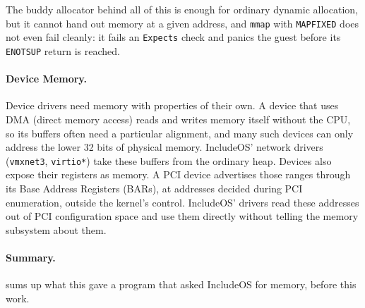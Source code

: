 \documentclass[12pt]{report}
\renewcommand{\_}{\origunderscore\allowbreak}
\begin{document}
The buddy allocator behind all of this is enough for ordinary dynamic allocation, but it cannot hand out memory at a given address, and \texttt{mmap} with \texttt{MAP\_FIXED} does not even fail cleanly: it fails an \texttt{Expects} check and panics the guest before its \texttt{ENOTSUP} return is reached.

\paragraph{Device Memory.}

Device drivers need memory with properties of their own. A device that uses DMA (direct memory access) reads and writes memory itself without the CPU, so its buffers often need a particular alignment, and many such devices can only address the lower 32 bits of physical memory. IncludeOS' network drivers (\texttt{vmxnet3}, \texttt{virtio*}) take these buffers from the ordinary heap. Devices also expose their registers as memory. A PCI device advertises those ranges through its Base Address Registers (BARs), at addresses decided during PCI enumeration, outside the kernel's control. IncludeOS' drivers read these addresses out of PCI configuration space and use them directly without telling the memory subsystem about them.

\paragraph{Summary.}  sums up what this gave a program that asked IncludeOS for memory, before this work.
\end{document}

